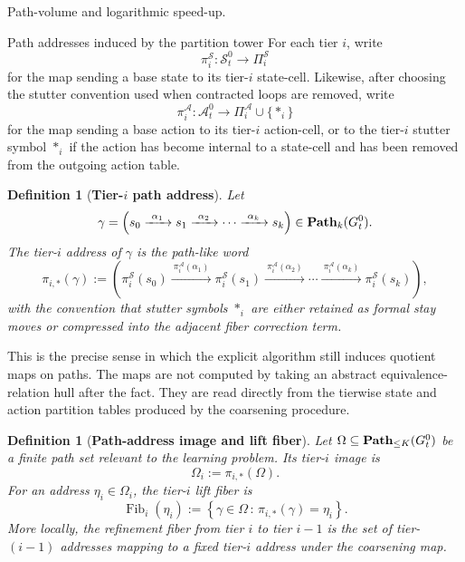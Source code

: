 \documentclass[11pt]{article}
\newtheorem{definition}[subsubsection]{Definition}
\newcommand{\fiber}{\operatorname{Fib}}
\begin{document}
\begin{section}{Path-volume and logarithmic speed-up.}
\begin{subsection}{Path addresses induced by the partition tower}
For each tier $i$, write
$$
\pi_i^{\mathcal S}:\mathcal{S}_t^0\longrightarrow\Pi_i^{\mathcal S}
$$
for the map sending a base state to its tier-$i$ state-cell. Likewise, after choosing the stutter convention used when contracted loops are removed, write
$$
\pi_i^{\mathcal A}:\mathcal{A}_t^0\longrightarrow\Pi_i^{\mathcal A}\cup\{\ast_i\}
$$
for the map sending a base action to its tier-$i$ action-cell, or to the tier-$i$ stutter symbol $\ast_i$ if the action has become internal to a state-cell and has been removed from the outgoing action table.

\begin{definition}[{\bf Tier-$i$ path address}]\label{def:tier-i-path-address}
\normalfont
Let
$$
\gamma
=
\left(
s_0\xrightarrow{\ \alpha_1\ }s_1
\xrightarrow{\ \alpha_2\ }\cdots
\xrightarrow{\ \alpha_k\ }s_k
\right)
\in \bold{Path}_k(G_t^0).
$$
The tier-$i$ address of $\gamma$ is the path-like word
$$
\pi_{i,*}(\gamma)
:=
\left(
\pi_i^{\mathcal S}(s_0)
\xrightarrow{\ \pi_i^{\mathcal A}(\alpha_1)\ }
\pi_i^{\mathcal S}(s_1)
\xrightarrow{\ \pi_i^{\mathcal A}(\alpha_2)\ }
\cdots
\xrightarrow{\ \pi_i^{\mathcal A}(\alpha_k)\ }
\pi_i^{\mathcal S}(s_k)
\right),
$$
with the convention that stutter symbols $\ast_i$ are either retained as formal stay moves or compressed into the adjacent fiber correction term.
\end{definition}

This is the precise sense in which the explicit algorithm still induces quotient maps on paths. The maps are not computed by taking an abstract equivalence-relation hull after the fact. They are read directly from the tierwise state and action partition tables produced by the coarsening procedure.

\begin{definition}[{\bf Path-address image and lift fiber}]\label{def:path-address-image}
\normalfont
Let
$
\Omega\subseteq\bold{Path}_{\le K}(G_t^0)
$
be a finite path set relevant to the learning problem. Its tier-$i$ image is
$$
\Omega_i:=\pi_{i,*}(\Omega).
$$
For an address $\eta_i\in\Omega_i$, the tier-$i$ lift fiber is
$$
\fiber_i(\eta_i)
:=
\left\{
\gamma\in\Omega
\,:\,
\pi_{i,*}(\gamma)=\eta_i
\right\}.
$$
More locally, the refinement fiber from tier $i$ to tier $i-1$ is the set of tier-$(i-1)$ addresses mapping to a fixed tier-$i$ address under the coarsening map.
\end{definition}


\end{subsection}
\end{section}
\end{document}
